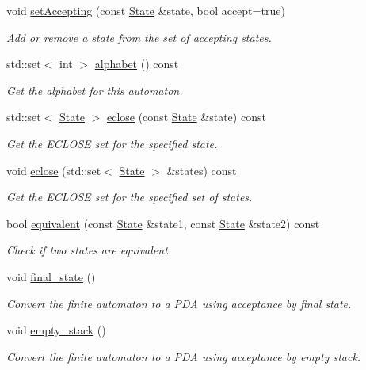 \begin{DoxyCompactItemize}
void \hyperlink{class_finite_automaton_aabadad17e0ddb008417b27c67e778c81}{set\-Accepting} (const \hyperlink{class_state}{\-State} \&state, bool accept=true)
\begin{DoxyCompactList}\small\item\em \-Add or remove a state from the set of accepting states. \end{DoxyCompactList}\item 
std\-::set$<$ int $>$ \hyperlink{class_finite_automaton_a127e630cdbb8efaf9dae4b004acb8747}{alphabet} () const 
\begin{DoxyCompactList}\small\item\em \-Get the alphabet for this automaton. \end{DoxyCompactList}\item 
std\-::set$<$ \hyperlink{class_state}{\-State} $>$ \hyperlink{class_finite_automaton_ac153db819f69f154d26e7c15ca10a907}{eclose} (const \hyperlink{class_state}{\-State} \&state) const 
\begin{DoxyCompactList}\small\item\em \-Get the \-E\-C\-L\-O\-S\-E set for the specified state. \end{DoxyCompactList}\item 
void \hyperlink{class_finite_automaton_af9af3606c2389b779c99dfcae78374e9}{eclose} (std\-::set$<$ \hyperlink{class_state}{\-State} $>$ \&states) const 
\begin{DoxyCompactList}\small\item\em \-Get the \-E\-C\-L\-O\-S\-E set for the specified set of states. \end{DoxyCompactList}\item 
bool \hyperlink{class_finite_automaton_a2cf753f71b6dcb52509e6324fdfae012}{equivalent} (const \hyperlink{class_state}{\-State} \&state1, const \hyperlink{class_state}{\-State} \&state2) const 
\begin{DoxyCompactList}\small\item\em \-Check if two states are equivalent. \end{DoxyCompactList}\item 
void \hyperlink{class_finite_automaton_a6876fbed7fd822d0cad76e352c368eff}{final\-\_\-state} ()
\begin{DoxyCompactList}\small\item\em \-Convert the finite automaton to a \-P\-D\-A using acceptance by final state. \end{DoxyCompactList}\item 
void \hyperlink{class_finite_automaton_a4739cb28dc9241d67fdbd20eff7d8817}{empty\-\_\-stack} ()
\begin{DoxyCompactList}\small\item\em \-Convert the finite automaton to a \-P\-D\-A using acceptance by empty stack. \end{DoxyCompactList}\end{DoxyCompactItemize}
